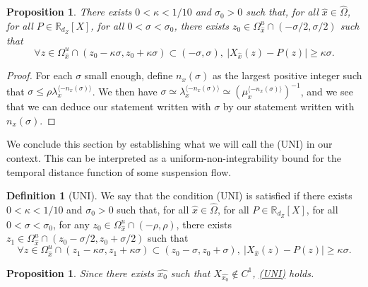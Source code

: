 \documentclass[a4paper]{article}
\newtheorem{proposition}[theorem]{Proposition}
\theoremstyle{definition}
\newtheorem{definition}{Definition}[section]
\begin{document}
\begin{proposition}\label{prop:preUNI}
There exists $0<\kappa<1/10$ and $\sigma_0 > 0$ such that, for all ${\widehat{x}} \in \widehat{\Omega}$, for all $P \in \mathbb{R}_{d_Z}[X]$, for all $0<\sigma<\sigma_0$, there exists $z_0 \in \Omega_{{\widehat{x}}}^u \cap (- \sigma/2, \sigma/2)$ such that
$$\forall z \in \Omega_{\widehat{x}}^u \cap (z_0 - \kappa \sigma, z_0 + \kappa \sigma) \subset(- \sigma, \sigma), \  |X_{\widehat{x}}(z) - P(z)| \geq \kappa \sigma .$$
\end{proposition}

\begin{proof}
For each $\sigma$ small enough, define $n_x(\sigma)$ as the largest positive integer such that $ \sigma \leq \rho \lambda_x^{\langle -n_x(\sigma) \rangle}$.
We then have $\sigma \simeq \lambda_x^{\langle -n_x(\sigma) \rangle } \simeq (\mu_x^{\langle -n_x(\sigma) \rangle})^{-1}$, and we see that we can deduce our statement written with $\sigma$ by our statement written with $n_x(\sigma)$.
\end{proof}


We conclude this section by establishing what we will call the  (UNI) in our context. This can be interpreted as a uniform-non-integrability bound for the temporal distance function of some suspension flow.

\begin{definition}[UNI]\label{UNI}
We say that the condition (UNI) is satisfied if there exists $0<\kappa<1/10$ and $\sigma_0 > 0$ such that, for all ${\widehat{x}} \in \widehat{\Omega}$, for all $P \in \mathbb{R}_{d_Z}[X]$, for all $0<\sigma<\sigma_0$, for any $z_0 \in \Omega_{\widehat{x}}^u \cap (-\rho,\rho)$, there exists $z_1 \in \Omega_{{\widehat{x}}}^u \cap (z_0 -  \sigma/2,z_0+ \sigma/2)$ such that
$$\forall z \in \Omega_{\widehat{x}}^u \cap (z_1 - \kappa \sigma, z_1 + \kappa \sigma) \subset(z_0 - \sigma,z_0+\sigma), \  |X_{\widehat{x}}(z) - P(z)| \geq \kappa \sigma .$$
\end{definition}


\begin{proposition}\label{prop:UNI}
Since there exists ${\widehat{x_0}}$ such that $X_{\widehat{x_0}} \notin C^1$, \hyperref[UNI]{(UNI)} holds.
\end{proposition}
\end{document}
